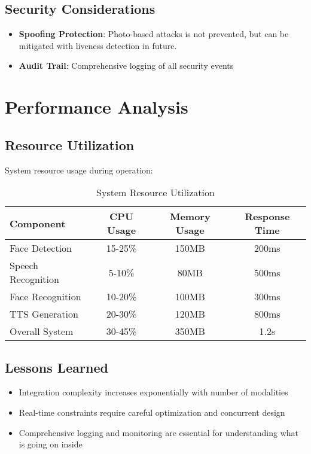\documentclass[11pt,a4paper]{article}
\begin{document}
\subsection{Security Considerations}

\begin{itemize}
    \item \textbf{Spoofing Protection}: Photo-based attacks is not prevented, but can be mitigated with liveness detection in future.
    \item \textbf{Audit Trail}: Comprehensive logging of all security events
\end{itemize}

\section{Performance Analysis}

\subsection{Resource Utilization}

System resource usage during operation:

\begin{table}[H]
\centering
\begin{tabular}{|l|c|c|c|}
\hline
\textbf{Component} & \textbf{CPU Usage} & \textbf{Memory Usage} & \textbf{Response Time} \\
\hline
Face Detection & 15-25\% & 150MB & 200ms \\
Speech Recognition & 5-10\% & 80MB & 500ms \\
Face Recognition & 10-20\% & 100MB & 300ms \\
TTS Generation & 20-30\% & 120MB & 800ms \\
Overall System & 30-45\% & 350MB & 1.2s \\
\hline
\end{tabular}
\caption{System Resource Utilization}
\end{table}


\subsection{Lessons Learned}

\begin{itemize}
    \item Integration complexity increases exponentially with number of modalities
    \item Real-time constraints require careful optimization and concurrent design
    \item Comprehensive logging and monitoring are essential for understanding what is going on inside
\end{itemize}
\end{document}
